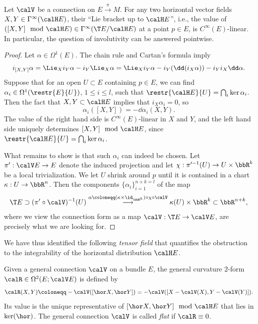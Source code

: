 \begin{prop}
    Let $\calV$ be a connection on $E\overset{\pi}{\to}M$. For any two horizontal vector fields $X,Y\in\Gamma^\infty(\calH E)$, their ``Lie bracket up to $\calH E$'', i.e., the value of $([X,Y]\mod \calH E)\in \Gamma^\infty(\T E\slash \calH E)$ at a point $p\in E$, is $C^\infty(E)$-linear. In particular, the question of involutivity can be answered pointwise.
\end{prop}
\begin{proof}
    Let $\alpha\in\Omega^1(E)$. The chain rule and Cartan's formula imply
    \[i_{[X,Y]}\alpha=\Lie_Xi_Y \alpha-i_Y \Lie_X\alpha=\Lie_Xi_Y\alpha-i_Y(\dd (i_X\alpha))-i_Yi_X\dd\alpha.\]
    Suppose that for an open $U\subset E$ containing $p\in E$, we can find $\alpha_i\in\Omega^1(\restr{E}{U})$, $1\leq i\leq l$, such that $\restr{\calH E}{U}=\bigcap_i\ker\alpha_i$. Then the fact that $X,Y\subset \calH E$ implies that $i_X\alpha_i=0$, so
    \[\alpha_i([X,Y])=-\dd\alpha_i(X,Y).\]
    The value of the right hand side is $C^\infty(E)$-linear in $X$ and $Y$, and the left hand side uniquely determines $[X,Y]\mod \calH E$, since $\restr{\calH E}{U}=\bigcap_i \ker\alpha_i$. 

    What remains to show is that such $\alpha_i$ can indeed be chosen. Let $\pi':\calV E\to E$ denote the induced projection and let $\chi:\pi^{\prime-1}(U)\to U\times\bbR^k$ be a local trivialization. We let $U$ shrink around $p$ until it is contained in a chart $\kappa:U\to \bbR^n$. Then the components $\{\alpha_i\}_{i=1}^{n+k=l}$ of the map
    \[\T E\supset (\pi'\circ\calV)^{-1}(U)\overset{\alpha\coloneqq (\kappa\times\id_{\bbR^k})\circ\chi\circ \calV}{\longrightarrow}\kappa(U)\times\bbR^k\subset \bbR^{n+k},\]
    where we view the connection form as a map $\calV:\T E\to \calV E$, are precisely what we are looking for.
\end{proof}

We have thus identified the following \emph{tensor field} that quantifies the obstruction to the integrability of the horizontal distribution $\calH E$.

\begin{defn}
    Given a general connection $\calV$ on a bundle $E$, the general curvature $2$-form $\calR\in \Omega^2(E;\calV E)$ is defined by
    \[\calR(X,Y)\coloneqq -\calV([\hor X,\hor Y])=-\calV([X-\calV(X),Y-\calV(Y)]).\]
    Its value is the unique representative of $[\hor X,\hor Y]\mod \calH E$ that lies in $\ker(\hor)$. The general connection $\calV$ is called \emph{flat} if $\calR\equiv 0$.
\end{defn}


